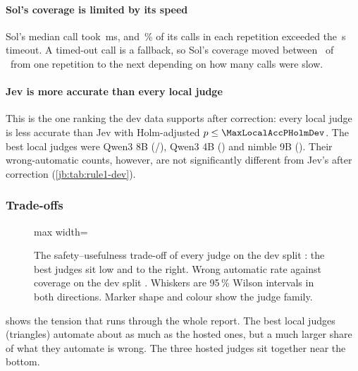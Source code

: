 \paragraph{Sol's coverage is limited by its speed} Sol's median call took \SolDevPfifty\,ms, and
\SolDevOverTimeoutPct\,\% of its calls in each repetition exceeded the \TimeoutS\,s timeout. A timed-out
call is a fallback, so Sol's coverage moved between \SolDevCovRange\ of \DevN\ from one repetition to
the next depending on how many calls were slow.

\paragraph{Jev is more accurate than every local judge} This is the one ranking the dev data supports
after correction: every local judge is less accurate than Jev with Holm-adjusted $p \le
\MaxLocalAccPHolmDev$. The best local judges were Qwen3 8B (\QwenEightDevAccK/\DevN), Qwen3 4B
(\QwenFourDevAccK) and nimble 9B (\NimbleDevAccK). Their wrong-automatic counts, however, are not
significantly different from Jev's after correction (\cref{jb:tab:rule1-dev}).

\subsubsection{Trade-offs}




\begin{figure}[tbp]
\centering
\begin{adjustbox}{max width=\linewidth}\end{adjustbox}
\caption{The safety--usefulness trade-off of every judge on the dev split \screen: the best judges sit low and to the right. Wrong automatic rate against coverage on the dev split \screen. Whiskers are 95\,\% Wilson
intervals in both directions. Marker shape and colour show the judge family.}
\label{jb:fig:wacov-dev}
\end{figure}

 shows the tension that runs through the whole report. The best local judges (triangles)
automate about as much as the hosted ones, but a much larger share of what they automate is wrong.
The three hosted judges sit together near the bottom.

